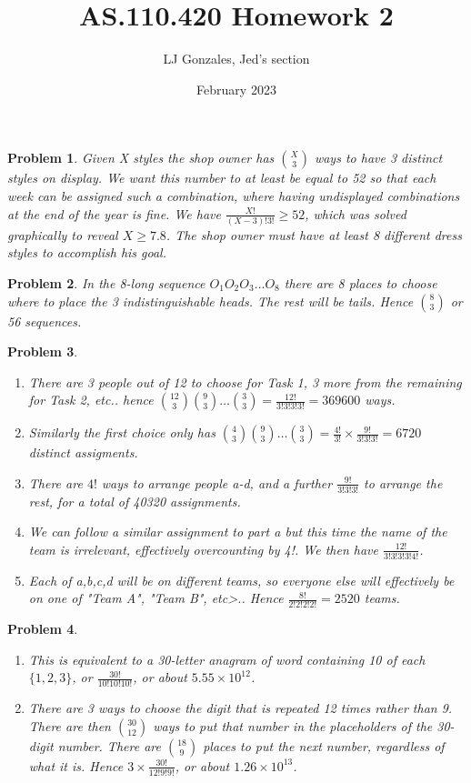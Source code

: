 \documentclass{article}
\title{AS.110.420 Homework 2}
\author{LJ Gonzales, Jed's section}
\date{February 2023}
\theoremstyle{mystyle}
\newtheorem{prob}{Problem}
\begin{document}
\maketitle

\begin{prob}
Given X styles the shop owner has ${X \choose 3}$ ways to have 3 distinct styles on display. We want this number to at least be equal to 52 so that each week can be assigned such a combination, where having undisplayed combinations at the end of the year is fine. We have $\frac{X!}{(X-3)!3!}\geq52$, which was solved graphically to reveal $X\geq7.8$. The shop owner must have at least 8 different dress styles to accomplish his goal.
\end{prob}

\begin{prob}
    In the 8-long sequence $O_1O_2O_3\dots O_8$ there are 8 places to choose where to place the 3 indistinguishable heads. The rest will be tails. Hence ${8 \choose 3}$ or 56 sequences.
\end{prob}

\begin{prob}
    \begin{enumerate}
        \item There are 3 people out of 12 to choose for Task 1, 3 more from the remaining for Task 2, etc.. hence ${12 \choose 3}{9 \choose 3}\dots {3\choose3}=\frac{12!}{3!3!3!3!}=369600$ ways.
        \item Similarly the first choice only has ${4\choose3}{9\choose3}\dots{3\choose3}=\frac{4!}{3!}\times\frac{9!}{3!3!3!}=6720$ distinct assigments.
        \item There are $4!$ ways to arrange people a-d, and a further $\frac{9!}{3!3!3!}$ to arrange the rest, for a total of 40320 assignments.
        \item We can follow a similar assignment to part a but this time the name of the team is irrelevant, effectively overcounting by 4!. We then have $\frac{12!}{3!3!3!3!4!}$.
        \item Each of a,b,c,d will be on different teams, so everyone else will effectively be on one of "Team A", "Team B", etc>.. Hence $\frac{8!}{2!2!2!2!}= 2520$ teams.
    \end{enumerate}
\end{prob}

\begin{prob}
    \begin{enumerate}
        \item This is equivalent to a 30-letter anagram of  word containing 10 of each $\{1,2,3\}$, or $\frac{30!}{10!10!10!}$, or about $5.55\times10^{12}$.
        \item There are 3 ways to choose the digit that is repeated 12 times rather than 9. There are then ${30 \choose 12}$ ways to put that number in the placeholders of the 30-digit number. There are ${18 \choose 9}$ places to put the next number, regardless of what it is. Hence $3\times\frac{30!}{12!9!9!}$, or about $1.26\times10^{13}$.
    \end{enumerate}
\end{prob}
\end{document}
